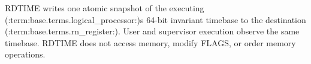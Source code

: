 RDTIME writes one atomic snapshot of the executing (:term:base.terms.logical_processor:)\textquotesingle{}s
64-bit invariant timebase to the destination (:term:base.terms.rn_register:). User and supervisor execution observe
the same timebase. RDTIME does not access memory, modify FLAGS, or order memory operations.
